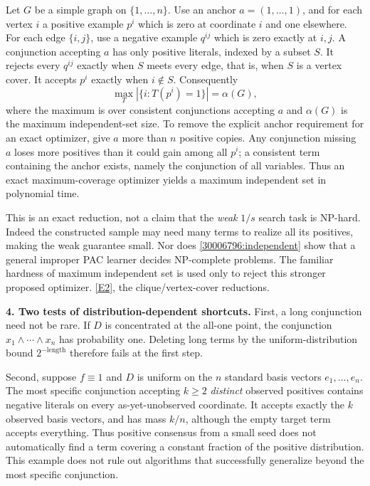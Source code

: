 \documentclass[11pt,a4paper]{article}
\newcommand{\eref}[2]{\hyperlink{extra:#1:#2}{[E#2]}}
\numberwithin{equation}{section}
\begin{document}
Let $G$ be a simple graph on $\{1,\ldots,n\}$. Use an anchor
$a=(1,\ldots,1)$, and for each vertex $i$ a positive example $p^i$ which
is zero at coordinate $i$ and one elsewhere. For each edge $\{i,j\}$,
use a negative example $q^{ij}$ which is zero exactly at $i,j$.
A conjunction accepting $a$ has only positive literals, indexed by a
subset $S$. It rejects every $q^{ij}$ exactly when $S$ meets every edge,
that is, when $S$ is a vertex cover. It accepts $p^i$ exactly when
$i\notin S$. Consequently
\begin{equation}\label{30006796:independent}
 \max_T|\{i:T(p^i)=1\}|=\alpha(G),
\end{equation}
where the maximum is over consistent conjunctions accepting $a$ and
$\alpha(G)$ is the maximum independent-set size.
To remove the explicit anchor requirement for an exact optimizer, give
$a$ more than $n$ positive copies. Any conjunction missing $a$ loses
more positives than it could gain among all $p^i$; a consistent term
containing the anchor exists, namely the conjunction of all variables.
Thus an exact maximum-coverage optimizer yields a maximum independent
set in polynomial time.

This is an exact reduction, not a claim that the \emph{weak} $1/s$
search task is NP-hard. Indeed the constructed sample may need many
terms to realize all its positives, making the weak guarantee small.
Nor does \eqref{30006796:independent} show that a general improper PAC
learner decides NP-complete problems. The familiar hardness of maximum
independent set is used only to reject this stronger proposed optimizer.
\eref{30006796}{2}, the clique/vertex-cover reductions.

\textbf{4. Two tests of distribution-dependent shortcuts.}
First, a long conjunction need not be rare. If $D$ is concentrated at
the all-one point, the conjunction $x_1\wedge\cdots\wedge x_n$ has
probability one. Deleting long terms by the uniform-distribution bound
$2^{-\text{length}}$ therefore fails at the first step.

Second, suppose $f\equiv1$ and $D$ is uniform on the $n$ standard basis
vectors $e_1,\ldots,e_n$. The most specific conjunction accepting
$k\ge2$ \emph{distinct} observed positives contains negative literals
on every as-yet-unobserved coordinate. It accepts exactly the $k$
observed basis vectors, and has mass $k/n$, although the empty target
term accepts everything. Thus positive consensus from a small seed does
not automatically find a term covering a constant fraction of the
positive distribution. This example does not rule out algorithms that
successfully generalize beyond the most specific conjunction.
\end{document}
